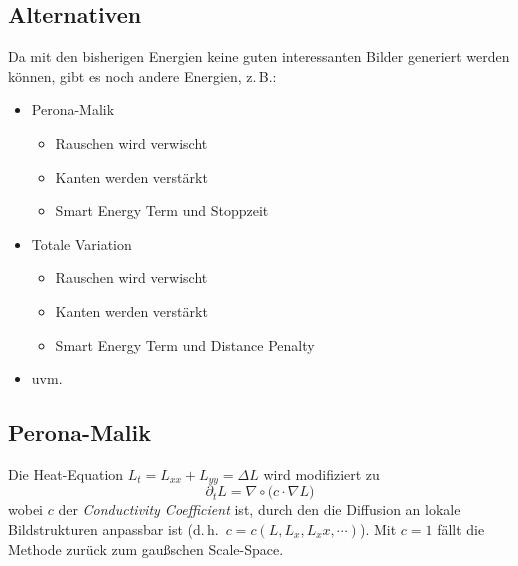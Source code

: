 \documentclass[a4paper, 11pt, accentcolor = tud3b]{tudreport}
\renewcommand{\dh}{d.\,h.~}
\begin{document}
			\subsection{Alternativen}
				Da mit den bisherigen Energien keine guten interessanten Bilder generiert werden können, gibt es noch andere Energien, z.\,B.:
				\begin{itemize}
					\item Perona-Malik
						\begin{itemize}
							\item Rauschen wird verwischt
							\item Kanten werden verstärkt
							\item Smart Energy Term und Stoppzeit
						\end{itemize}
					\item Totale Variation
						\begin{itemize}
							\item Rauschen wird verwischt
							\item Kanten werden verstärkt
							\item Smart Energy Term und Distance Penalty
						\end{itemize}
					\item uvm.
				\end{itemize}

			\subsection{Perona-Malik}
				Die Heat-Equation \( L_t = L_{xx} + L_{yy} = \Delta L \) wird modifiziert zu
				\begin{equation*}
					\partial_t L = \nabla \circ \big( c \cdot \nabla L \big)
				\end{equation*}
				wobei \(c\) der \emph{Conductivity Coefficient} ist, durch den die Diffusion an lokale Bildstrukturen anpassbar ist (\dh \( c = c(L, L_x, L_xx, \cdots) \)). Mit \( c = 1 \) fällt die Methode zurück zum gaußschen Scale-Space.
\end{document}
